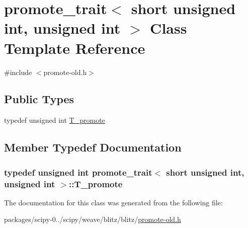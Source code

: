 \hypertarget{classpromote__trait_3_01short_01unsigned_01int_00_01unsigned_01int_01_4}{}\section{promote\+\_\+trait$<$ short unsigned int, unsigned int $>$ Class Template Reference}
\label{classpromote__trait_3_01short_01unsigned_01int_00_01unsigned_01int_01_4}


{\ttfamily \#include $<$promote-\/old.\+h$>$}

\subsection*{Public Types}
\begin{DoxyCompactItemize}
\item 
typedef unsigned int \hyperlink{classpromote__trait_3_01short_01unsigned_01int_00_01unsigned_01int_01_4_ab5af1d47389f05e8ad610a0c960ef89d}{T\+\_\+promote}
\end{DoxyCompactItemize}


\subsection{Member Typedef Documentation}
\hypertarget{classpromote__trait_3_01short_01unsigned_01int_00_01unsigned_01int_01_4_ab5af1d47389f05e8ad610a0c960ef89d}{}
\subsubsection[{T\+\_\+promote}]{\setlength{\rightskip}{0pt plus 5cm}typedef unsigned int {\bf promote\+\_\+trait}$<$ short unsigned int, unsigned int $>$\+::{\bf T\+\_\+promote}}\label{classpromote__trait_3_01short_01unsigned_01int_00_01unsigned_01int_01_4_ab5af1d47389f05e8ad610a0c960ef89d}


The documentation for this class was generated from the following file\+:\begin{DoxyCompactItemize}
\item 
packages/scipy-\/0../scipy/weave/blitz/blitz/\hyperlink{promote-old_8h}{promote-\/old.\+h}\end{DoxyCompactItemize}
